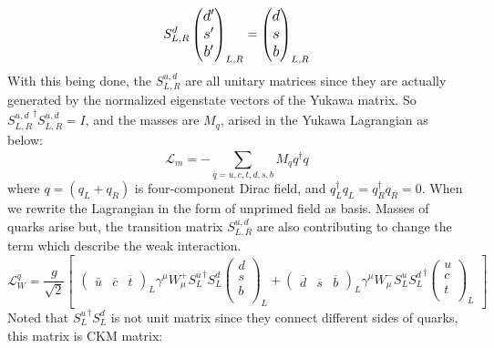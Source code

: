 \begin{equation}
\large
S_{L,R}^{d}
\begin{pmatrix}
d^\prime   \\
s^\prime  \\
b^\prime 
\end{pmatrix}_{L,R}
= \begin{pmatrix}
d  \\
s  \\
b 
\end{pmatrix}_{L,R}
\end{equation}
With this being done, the $S^{u,d}_{L,R}$ are all unitary matrices since they are actually generated by the normalized eigenstate vectors of the Yukawa matrix. So ${S_{L,R}^{u,d}}^\dag S_{L,R}^{u,d} = I$, and the masses are $M_q$, arised in the Yukawa Lagrangian as below: 
\begin{equation}
\mathcal{L}_{m} = -\sum_{q=u,c,t,d,s,b}^{} M_q q^\dag q
\end{equation}
where $q=(q_L+q_R)$ is four-component Dirac field, and $q_L^\dag q_L = q_R^\dag q_R = 0$. When we rewrite the Lagrangian in the form of unprimed field as basis. Masses of quarks arise but, the transition matrix $S^{u,d}_{L,R}$ are also contributing to change the term which describe the weak interaction. 
\begin{equation}
\mathcal{L}^q_W = \frac{g}{\sqrt{2}}
\begin{bmatrix}
\begin{pmatrix}
\overline{u}&\overline{c}&\overline{t}
\end{pmatrix}_L

\gamma^\mu W^{+}_{\mu}
{S^{u}_{L}}^{\dag}
S^{d}_{L}
\begin{pmatrix}
d\\s\\b\\
\end{pmatrix}_L+
\begin{pmatrix}
\overline{d}&\overline{s}&\overline{b}
\end{pmatrix}_L
\gamma^\mu W^{-}_{\mu}
S^{u}_{L}
{S^{d}_{L}}^{\dag}
\begin{pmatrix}
u\\c\\t\\
\end{pmatrix}_L
\end{bmatrix}
\end{equation}
Noted that ${S^{u}_{L}}^{\dag} S^{d}_{L}$ is not unit matrix since they connect different sides of quarks, this matrix is CKM matrix:
